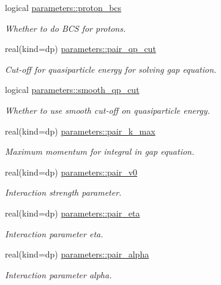 \begin{DoxyCompactItemize}
logical \mbox{\hyperlink{group__INPUT__PARS_ga7478728bc2b5fc83dee2f2c21724420c}{parameters\+::proton\+\_\+bcs}}
\begin{DoxyCompactList}\small\item\em Whether to do B\+CS for protons. \end{DoxyCompactList}\item 
real(kind=dp) \mbox{\hyperlink{group__INPUT__PARS_gaddd04025cfa9a151f25211259364f404}{parameters\+::pair\+\_\+qp\+\_\+cut}}
\begin{DoxyCompactList}\small\item\em Cut-\/off for quasiparticle energy for solving gap equation. \end{DoxyCompactList}\item 
logical \mbox{\hyperlink{group__INPUT__PARS_ga20f7226ffbb05232c930c81d83afee32}{parameters\+::smooth\+\_\+qp\+\_\+cut}}
\begin{DoxyCompactList}\small\item\em Whether to use smooth cut-\/off on quasiparticle energy. \end{DoxyCompactList}\item 
real(kind=dp) \mbox{\hyperlink{group__INPUT__PARS_ga0d7d7715270e262c6f4e02633947b548}{parameters\+::pair\+\_\+k\+\_\+max}}
\begin{DoxyCompactList}\small\item\em Maximum momentum for integral in gap equation. \end{DoxyCompactList}\item 
real(kind=dp) \mbox{\hyperlink{group__INPUT__PARS_gaecd0609846081f6a90f49cc0f162c9cd}{parameters\+::pair\+\_\+v0}}
\begin{DoxyCompactList}\small\item\em Interaction strength parameter. \end{DoxyCompactList}\item 
real(kind=dp) \mbox{\hyperlink{group__INPUT__PARS_gacd8c346f8b069e0dca502d57557b21e7}{parameters\+::pair\+\_\+eta}}
\begin{DoxyCompactList}\small\item\em Interaction parameter eta. \end{DoxyCompactList}\item 
real(kind=dp) \mbox{\hyperlink{group__INPUT__PARS_gaa3116e010e1f1435881ad489d7ea5dad}{parameters\+::pair\+\_\+alpha}}
\begin{DoxyCompactList}\small\item\em Interaction parameter alpha. \end{DoxyCompactList}\item 

\end{DoxyCompactItemize}
